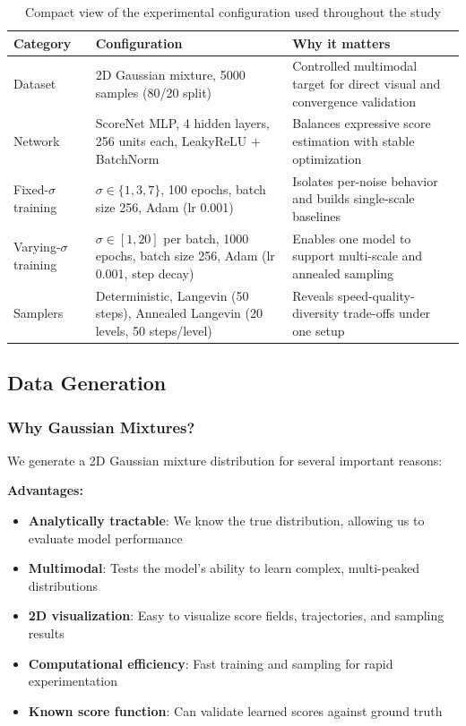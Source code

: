 \documentclass[journal]{IEEEtran}
\begin{document}
\begin{table}[t]
\centering
\small
\setlength{\tabcolsep}{4pt}
\begin{tabular}{p{}p{}p{}}
\toprule
Category & Configuration & Why it matters \\
\midrule
Dataset & 2D Gaussian mixture, 5000 samples (80/20 split) & Controlled multimodal target for direct visual and convergence validation \\
\midrule
Network & ScoreNet MLP, 4 hidden layers, 256 units each, LeakyReLU + BatchNorm & Balances expressive score estimation with stable optimization \\
\midrule
Fixed-$\sigma$ training & $\sigma \in \{1,3,7\}$, 100 epochs, batch size 256, Adam (lr 0.001) & Isolates per-noise behavior and builds single-scale baselines \\
\midrule
Varying-$\sigma$ training & $\sigma \in [1,20]$ per batch, 1000 epochs, batch size 256, Adam (lr 0.001, step decay) & Enables one model to support multi-scale and annealed sampling \\
\midrule
Samplers & Deterministic, Langevin (50 steps), Annealed Langevin (20 levels, 50 steps/level) & Reveals speed-quality-diversity trade-offs under one setup \\
\bottomrule
\end{tabular}
\normalsize
\caption{Compact view of the experimental configuration used throughout the study}
\label{tab:config_snapshot}
\end{table}

\subsection{Data Generation}

\subsubsection{Why Gaussian Mixtures?}

We generate a 2D Gaussian mixture distribution for several important reasons:

\textbf{Advantages:}
\begin{itemize}
    \item \textbf{Analytically tractable}: We know the true distribution, allowing us to evaluate model performance
    \item \textbf{Multimodal}: Tests the model's ability to learn complex, multi-peaked distributions
    \item \textbf{2D visualization}: Easy to visualize score fields, trajectories, and sampling results
    \item \textbf{Computational efficiency}: Fast training and sampling for rapid experimentation
    \item \textbf{Known score function}: Can validate learned scores against ground truth
\end{itemize}
\end{document}
